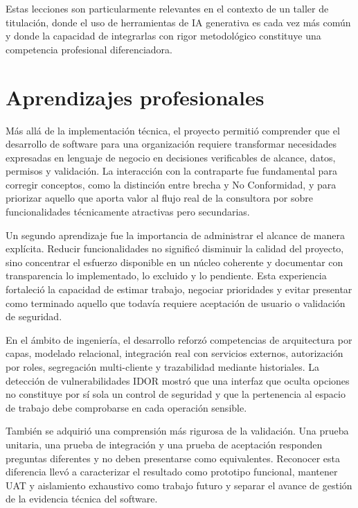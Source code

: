 \documentclass[final]{udpthesis}
\begin{document}
Estas lecciones son particularmente relevantes en el contexto de un taller de titulación, donde el uso de herramientas de IA generativa es cada vez más común y donde la capacidad de integrarlas con rigor metodológico constituye una competencia profesional diferenciadora.

\section{Aprendizajes profesionales}

Más allá de la implementación técnica, el proyecto permitió comprender que el desarrollo de software para una organización requiere transformar necesidades expresadas en lenguaje de negocio en decisiones verificables de alcance, datos, permisos y validación. La interacción con la contraparte fue fundamental para corregir conceptos, como la distinción entre brecha y No Conformidad, y para priorizar aquello que aporta valor al flujo real de la consultora por sobre funcionalidades técnicamente atractivas pero secundarias.

Un segundo aprendizaje fue la importancia de administrar el alcance de manera explícita. Reducir funcionalidades no significó disminuir la calidad del proyecto, sino concentrar el esfuerzo disponible en un núcleo coherente y documentar con transparencia lo implementado, lo excluido y lo pendiente. Esta experiencia fortaleció la capacidad de estimar trabajo, negociar prioridades y evitar presentar como terminado aquello que todavía requiere aceptación de usuario o validación de seguridad.

En el ámbito de ingeniería, el desarrollo reforzó competencias de arquitectura por capas, modelado relacional, integración real con servicios externos, autorización por roles, segregación multi-cliente y trazabilidad mediante historiales. La detección de vulnerabilidades IDOR mostró que una interfaz que oculta opciones no constituye por sí sola un control de seguridad y que la pertenencia al espacio de trabajo debe comprobarse en cada operación sensible.

También se adquirió una comprensión más rigurosa de la validación. Una prueba unitaria, una prueba de integración y una prueba de aceptación responden preguntas diferentes y no deben presentarse como equivalentes. Reconocer esta diferencia llevó a caracterizar el resultado como prototipo funcional, mantener UAT y aislamiento exhaustivo como trabajo futuro y separar el avance de gestión de la evidencia técnica del software.
\end{document}

